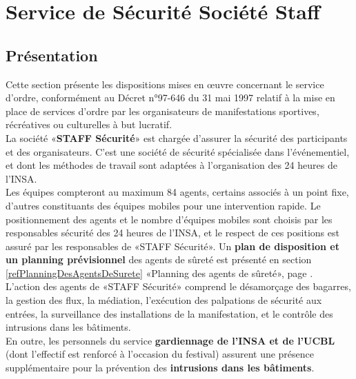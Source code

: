 \documentclass[hidelinks, paper=a4, fontsize=13pt]{report}
\begin{document}
\section{Service de Sécurité Société Staff}
\subsection{Présentation}
Cette section présente les dispositions mises en œuvre concernant le service d’ordre, conformément au Décret n°97-646 du 31 mai 1997 relatif à la mise en place de services d’ordre par les organisateurs de manifestations sportives, récréatives ou culturelles à but lucratif.\\

La société «\textbf{STAFF Sécurité}» est chargée d’assurer la sécurité des participants et des organisateurs. C’est une société de sécurité spécialisée dans l’événementiel, et dont les méthodes de travail sont adaptées à l’organisation des 24 heures de l'INSA.\\

Les équipes compteront au maximum 84 agents, certains associés à un point fixe, d’autres constituants des équipes mobiles pour une intervention rapide. Le positionnement des agents et le nombre d’équipes mobiles sont choisis par les responsables sécurité des 24 heures de l'INSA, et le respect de ces positions est assuré par les responsables de «STAFF Sécurité». Un \textbf{plan de disposition et un planning prévisionnel} des agents de sûreté est présenté en section \ref{refPlanningDesAgentsDeSurete} «Planning des agents de sûreté», page \pageref{refPlanningDesAgentsDeSurete}. \\

L’action des agents de  «STAFF Sécurité» comprend le désamorçage des bagarres, la gestion des flux, la médiation, l’exécution des palpations de sécurité aux entrées, la surveillance des installations de la manifestation, et le contrôle des intrusions dans les bâtiments.\\

En outre, les personnels du service \textbf{gardiennage de l’INSA et de l’UCBL} (dont l'effectif est renforcé à l'occasion du festival) assurent une présence supplémentaire pour la prévention des \textbf{intrusions dans les bâtiments}.
\end{document}
